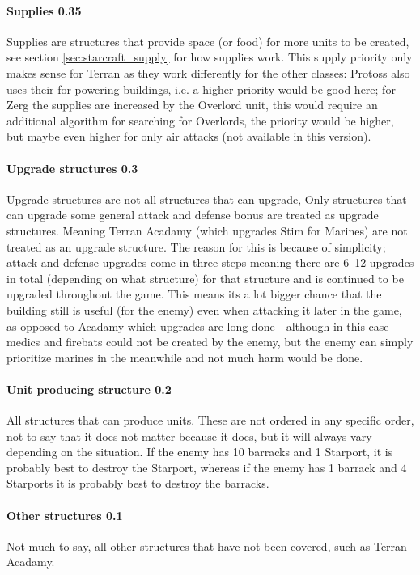 \paragraph{Supplies 0.35\conf}
Supplies are structures that provide space (or food) for more units to be created, see section \ref{sec:starcraft_supply} for how supplies work. This supply priority only makes sense for Terran as they work differently for the other classes: Protoss also uses their for powering buildings, i.e. a higher priority would be good here; for Zerg the supplies are increased by the Overlord unit, this would require an additional algorithm for searching for Overlords, the priority would be higher, but maybe even higher for only air attacks (not available in this version).

\paragraph{Upgrade structures 0.3\conf}
Upgrade structures are not all structures that can upgrade, Only structures that can upgrade some general attack and defense bonus are treated as upgrade structures. Meaning Terran Acadamy (which upgrades Stim for Marines) are not treated as an upgrade structure. The reason for this is because of simplicity; attack and defense upgrades come in three steps meaning there are 6–12 upgrades in total (depending on what structure) for that structure and is continued to be upgraded throughout the game. This means its a lot bigger chance that the building still is useful (for the enemy) even when attacking it later in the game, as opposed to Acadamy which upgrades are long done—although in this case medics and firebats could not be created by the enemy, but the enemy can simply prioritize marines in the meanwhile and not much harm would be done.

\paragraph{Unit producing structure 0.2\conf}
All structures that can produce units. These are not ordered in any specific order, not to say that it does not matter because it does, but it will always vary depending on the situation. If the enemy has 10 barracks and 1 Starport, it is probably best to destroy the Starport, whereas if the enemy has 1 barrack and 4 Starports it is probably best to destroy the barracks.

\paragraph{Other structures 0.1\conf}
Not much to say, all other structures that have not been covered, such as Terran Acadamy.

